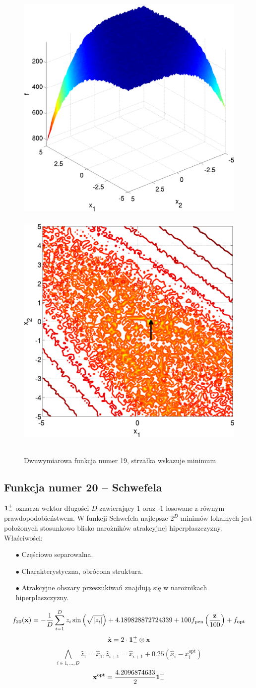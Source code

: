 \documentclass[a4paper,onecolumn,oneside,12pt,wide,floatssmall]{mwrep}
\theoremstyle{definition}
\theoremstyle{plain}%
\theoremstyle{remark}
\begin{document}
\begin{figure}[H]
\centering
\mbox{
\includegraphics[width=.45\textwidth]{img/19.png} \quad
\includegraphics[width=.45\textwidth]{img/19a.png} 
}
\caption{Dwuwymiarowa funkcja numer 19, strzałka wskazuje minimum \cite{noiseless}}
\end{figure}

\subsection{Funkcja numer 20 -- Schwefela}

$\bold{1}^+_-$ oznacza wektor długości $D$ zawierający 1 oraz -1 losowane z równym prawdopodobieństwem.
W funkcji Schwefela najlepsze $2^D$ minimów lokalnych jest położonych stosunkowo blisko narożników atrakcyjnej hiperpłaszczyzny. Właściwości:
\begin{itemize}
 \item[$\bullet$] Częściowo separowalna.
 \item[$\bullet$] Charakterystyczna, obrócona struktura.
 \item[$\bullet$] Atrakcyjne obszary przeszukiwań znajdują się w narożnikach hiperpłaszczyzny.
\end{itemize} 

$$ f_{20}(\bold{x}) = -\frac{1}{D} \sum^D_{i=1} z_i \sin\left(\sqrt{|z_i|}\right) + 4.189828872724339 + 100 f_\text{pen}\left(\frac{\bold{z}}{100}\right) + f_\text{opt} $$
$$ \hat{\bold{x}} = 2 \cdot \bold{1}^+_- \otimes \bold{x} $$
$$ \bigwedge_{i \in 1, \dots, D} \hat{z}_1 = \hat{x}_1, \hat{z}_{i+1} = \hat{x}_{i+1} + 0.25(\hat{x}_i - x_i^\text{opt}) $$ 
$$ \bold{x}^\text{opt} = \frac{4.2096874633}{2} \bold{1}^+_- $$
\end{document}
